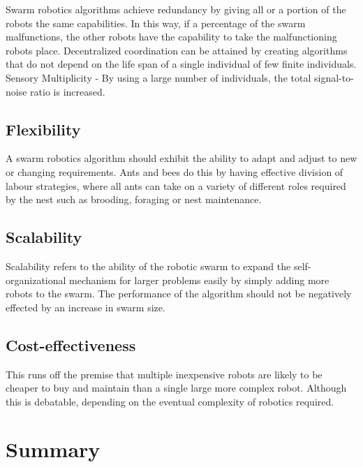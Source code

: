 Swarm robotics algorithms achieve redundancy by giving all or a portion of the robots the same capabilities. In this way, if a percentage  of the swarm malfunctions, the other robots have the capability to take the malfunctioning robots place. Decentralized coordination can be attained by creating algorithms that do not depend on the life span of a single individual of few finite individuals. Sensory Multiplicity - By using a large number of individuals, the total signal-to-noise ratio is increased. 


\subsection{Flexibility}
A swarm robotics algorithm should exhibit the ability to adapt and adjust to new or changing requirements. Ants and bees do this by having effective division of labour strategies, where all ants can take on a variety of different roles required by the nest such as brooding, foraging or nest maintenance. \cite{}

\subsection{Scalability}
 Scalability refers to the ability of the robotic swarm to expand the self-organizational mechanism for larger problems easily by simply adding more robots to the swarm.   The performance of the algorithm should not be negatively effected by an increase in swarm size. 

\subsection{Cost-effectiveness}
This runs off the premise that multiple inexpensive robots are likely to be cheaper to buy and maintain than a single large more complex robot. Although this is debatable, depending on the eventual complexity of robotics required. 


	





\section{Summary}
\label{sec:first:summary}



